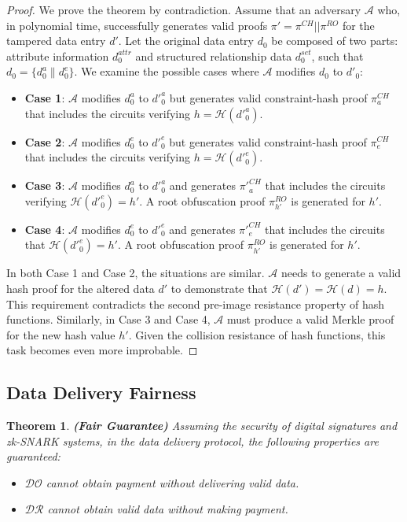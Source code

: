 \documentclass[journal]{IEEEtran}
\newtheorem{theorem}{Theorem}
\begin{document}
\begin{proof}
    We prove the theorem by contradiction. Assume that an adversary $\mathcal{A}$ who, in polynomial time, successfully generates valid proofs $\pi' = \pi^{CH} || \pi^{RO}$ for the tampered data entry $d'$. Let the original data entry $d_0$ be composed of two parts: attribute information $d_0^{attr}$ and structured relationship data $d_0^{set}$, such that $d_0 = \{d_0^{a} \parallel d_0^{e}\}$.
    We examine the possible cases where $\mathcal{A}$ modifies $d_0$ to $d'_0$:
    \begin{itemize}
        \item \textbf{Case 1}: $\mathcal{A}$ modifies $d^{a}_0$ to $d'^{a}_0$ but generates valid constraint-hash proof $\pi^{CH}_a$ that includes the circuits verifying $h = \mathcal{H}(d'^{a}_0)$. 

        \item \textbf{Case 2}: $\mathcal{A}$ modifies $d^{e}_0$ to $d'^{e}_0$ but generates valid constraint-hash proof $\pi^{CH}_e$ that includes the circuits verifying $h = \mathcal{H}(d'^{e}_0)$.
    
        \item \textbf{Case 3}: $\mathcal{A}$ modifies $d^{a}_0$ to $d'^{a}_0$ and generates $\pi'^{CH}_a$ that includes the circuits verifying $\mathcal{H}(d'^{e}_0) = h'$. A root obfuscation proof $\pi^{RO}_{h'}$ is generated for $h'$.

        \item \textbf{Case 4}: $\mathcal{A}$ modifies $d^{e}_0$ to $d'^{e}_0$ and generates $\pi'^{CH}_e$ that includes the circuits that $\mathcal{H}(d'^{e}_0) = h'$. A root obfuscation proof $\pi^{RO}_{h'}$ is generated for $h'$.

    \end{itemize}
    In both Case 1 and Case 2, the situations are similar. $\mathcal{A}$ needs to generate a valid hash proof for the altered data $d'$ to demonstrate that $\mathcal{H}(d') = \mathcal{H}(d) = h$. This requirement contradicts the second pre-image resistance property of hash functions. Similarly, in Case 3 and Case 4, $\mathcal{A}$ must produce a valid Merkle proof for the new hash value $h'$. Given the collision resistance of hash functions, this task becomes even more improbable.
\end{proof}

\subsection{Data Delivery Fairness}
\begin{theorem}
    \textbf{(Fair Guarantee)} 
    Assuming the security of digital signatures and zk-SNARK systems, in the data delivery protocol, the following properties are guaranteed:
    \begin{itemize}
        \item $\mathcal{DO}$ cannot obtain payment without delivering valid data.
        \item $\mathcal{DR}$ cannot obtain valid data without making payment.
    \end{itemize}
\end{theorem}
\end{document}

